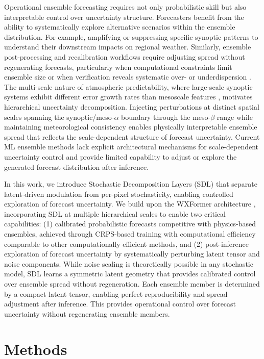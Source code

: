 \documentclass[11pt]{article}
\begin{document}
Operational ensemble forecasting requires not only probabilistic skill but also interpretable control over uncertainty structure. Forecasters benefit from the ability to systematically explore alternative scenarios within the ensemble distribution. For example, amplifying or suppressing specific synoptic patterns to understand their downstream impacts on regional weather. Similarly, ensemble post-processing and recalibration workflows require adjusting spread without regenerating forecasts, particularly when computational constraints limit ensemble size or when verification reveals systematic over- or underdispersion \cite{hamill1997verification, vannitsem2021statistical}. The multi-scale nature of atmospheric predictability, where large-scale synoptic systems exhibit different error growth rates than mesoscale features \cite{tribbia2004scale}, motivates hierarchical uncertainty decomposition. Injecting perturbations at distinct spatial scales spanning the synoptic/meso-$\alpha$ boundary through the meso-$\beta$ range while maintaining meteorological consistency enables physically interpretable ensemble spread that reflects the scale-dependent structure of forecast uncertainty. Current ML ensemble methods lack explicit architectural mechanisms for scale-dependent uncertainty control and provide limited capability to adjust or explore the generated forecast distribution after inference.

In this work, we introduce Stochastic Decomposition Layers (SDL) that separate latent-driven modulation from per-pixel stochasticity, enabling controlled exploration of forecast uncertainty. We build upon the WXFormer architecture \cite{schreck2025, chapman2025camulator}, incorporating SDL at multiple hierarchical scales to enable two critical capabilities: (1) calibrated probabilistic forecasts competitive with physics-based ensembles, achieved through CRPS-based training with computational efficiency comparable to other computationally efficient methods, and (2) post-inference exploration of forecast uncertainty by systematically perturbing latent tensor and noise components. While noise scaling is theoretically possible in any stochastic model, SDL learns a symmetric latent geometry that provides calibrated control over ensemble spread without regeneration. Each ensemble member is determined by a compact latent tensor, enabling perfect reproducibility and spread adjustment after inference. This provides operational control over forecast uncertainty without regenerating ensemble members.

\section{Methods}
\end{document}
